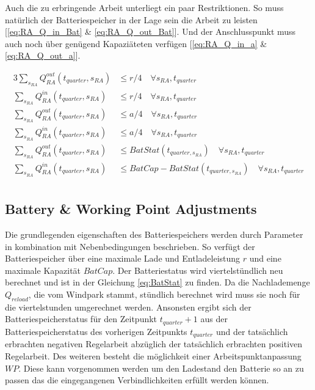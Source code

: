 Auch die zu erbringende Arbeit unterliegt ein paar Restriktionen. So muss natürlich der Batteriespeicher in der Lage sein die Arbeit zu leisten [\ref{eq:RA_Q_in_Bat} \& \ref{eq:RA_Q_out_Bat}].
Und der Anschlusspunkt muss auch noch über genügend Kapaziäteten verfügen [\ref{eq:RA_Q_in_a} \& \ref{eq:RA_Q_out_a}].

\begin{alignat}{3}
	\sum_{s_{RA}} Q^{out}_{RA}(t_{quarter}, s_{RA}) & \leq r/4 \quad \forall s_{RA}, t_{quarter} \label{eq:RA_Q_out_r}                                    \\
	\sum_{s_{RA}} Q^{in}_{RA}(t_{quarter}, s_{RA})  & \leq r/4 \quad \forall s_{RA}, t_{quarter} \label{eq:RA_Q_in_r}                                     \\
	\sum_{s_{RA}} Q^{out}_{RA}(t_{quarter}, s_{RA}) & \leq a/4 \quad \forall s_{RA}, t_{quarter} \label{eq:RA_Q_out_a}                                    \\
	\sum_{s_{RA}} Q^{in}_{RA}(t_{quarter}, s_{RA})  & \leq a/4 \quad \forall s_{RA}, t_{quarter} \label{eq:RA_Q_in_a}                                     \\
	\sum_{s_{RA}} Q^{out}_{RA}(t_{quarter}, s_{RA}) & \leq BatStat(t_{quarter, s_{RA}}) \quad \forall s_{RA}, t_{quarter} \label{eq:RA_Q_out_Bat}         \\
	\sum_{s_{RA}} Q^{in}_{RA}(t_{quarter}, s_{RA})  & \leq BatCap - BatStat(t_{quarter, s_{RA}}) \quad \forall s_{RA}, t_{quarter} \label{eq:RA_Q_in_Bat} \\
\end{alignat}



\subsection{Battery \& Working Point Adjustments}
Die grundlegenden eigenschaften des Batteriespeichers werden durch Parameter in kombination mit Nebenbedingungen beschrieben.
So verfügt der Batteriespeicher über eine maximale Lade und Entladeleistung $r$ und eine maximale Kapazität $BatCap$.
Der Batteriestatus wird viertelstündlich neu berechnet und ist in der Gleichung \ref{eq:BatStat} zu finden.
Da die Nachlademenge $Q_{reload}$, die vom Windpark stammt, stündlich berechnet wird muss sie noch für die viertelstunden umgerechnet werden.
Ansonsten ergibt sich der Batteriespeicherstatus für den Zeitpunkt $t_{quarter} + 1$ aus der Batteriespeicherstatus des vorherigen Zeitpunkts $t_{quarter}$ und der
tatsächlich erbrachten negativen Regelarbeit abzüglich der tatsächlich erbrachten positiven Regelarbeit.
Des weiteren besteht die möglichkeit einer Arbeitspunktanpassung $WP$. Diese kann vorgenommen werden um den Ladestand den Batterie so an zu
passen das die eingegangenen Verbindlichkeiten erfüllt werden können.

